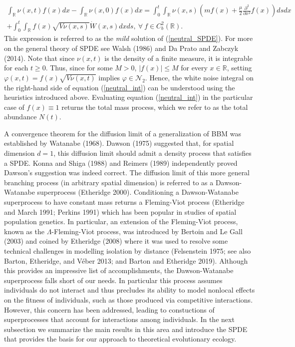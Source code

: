 \documentclass[]{article}
\begin{document}
\begin{multline}\label{neutral_int}
\int_\mathbb{R}\nu(x,t)f(x)dx-\int_\mathbb{R}\nu(x,0)f(x)dx=\int_0^t\int_\mathbb{R}\nu(x,s)\left(mf(x)+\frac{\mu}{2}\frac{\partial^2}{\partial x^2}f(x)\right)dsdx \\
+\int_0^t\int_\mathbb{R}f(x)\sqrt{V\nu(x,s)}\dot W(x,s)dxds, \ \forall \ f\in C_b^2(\mathbb{R}).
\end{multline} This expression is referred to as the \emph{mild}
solution of (\ref{neutral_SPDE}). For more on the general theory of SPDE
see Walsh (1986) and Da Prato and Zabczyk (2014). Note that since
\(\nu(x,t)\) is the density of a finite measure, it is integrable for
each \(t\geq0\). Thus, since for some \(M>0\), \(|f(x)|\leq M\) for
every \(x\in\mathbb{R}\), setting \(\varphi(x,t)=f(x)\sqrt{V\nu(x,t)}\)
implies \(\varphi\in\mathscr{N}_2\). Hence, the white noise integral on
the right-hand side of equation (\ref{neutral_int}) can be understood
using the heuristics introduced above. Evaluating equation
(\ref{neutral_int}) in the particular case of \(f(x)\equiv1\) returns
the total mass process, which we refer to as the total abundance
\(N(t)\).

A convergence theorem for the diffusion limit of a generalization of BBM
was established by Watanabe (1968). Dawson (1975) suggested that, for
spatial dimension \(d=1\), this diffusion limit should admit a density
process that satisfies a SPDE. Konna and Shiga (1988) and Reimers (1989)
independently proved Dawson's suggestion was indeed correct. The
diffusion limit of this more general branching process (in arbitrary
spatial dimension) is referred to as a Dawson-Watanabe superprocess
(Etheridge 2000). Conditioning a Dawson-Watanabe superprocess to have
constant mass returns a Fleming-Viot process (Etheridge and March 1991;
Perkins 1991) which has been popular in studies of spatial population
genetics. In particular, an extension of the Fleming-Viot process, known
as the \(\Lambda\)-Fleming-Viot process, was introduced by Bertoin and
Le Gall (2003) and coined by Etheridge (2008) where it was used to
resolve some technical challenges in modelling isolation by distance
(Felsenstein 1975; see also Barton, Etheridge, and Véber 2013; and
Barton and Etheridge 2019). Although this provides an impressive list of
accomplishments, the Dawson-Watanabe superprocess falls short of our
needs. In particular this process assumes individuals do not interact
and thus precludes its ability to model nonlocal effects on the fitness
of individuals, such as those produced via competitive interactions.
However, this concern has been addressed, leading to constuctions of
superprocesses that account for interactions among individuals. In the
next subsection we summarize the main results in this area and introduce
the SPDE that provides the basis for our approach to theoretical
evolutionary ecology.
\end{document}
